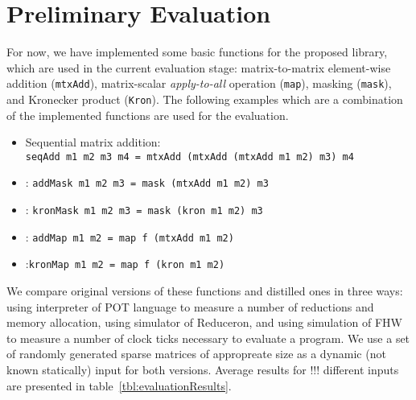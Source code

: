 \section{Preliminary Evaluation}

For now, we have implemented some basic functions for the proposed library, which are used in the current evaluation stage: matrix-to-matrix element-wise addition (\verb|mtxAdd|),
matrix-scalar \emph{apply-to-all} operation (\verb|map|),
masking (\verb|mask|), and Kronecker product (\verb|Kron|).
The following examples which are a combination of the implemented functions are used for the evaluation.
\begin{itemize}
\item Sequential matrix addition:\\
  \verb|seqAdd m1 m2 m3 m4 = mtxAdd (mtxAdd (mtxAdd m1 m2) m3) m4|
\item {}: \verb|addMask m1 m2 m3 = mask (mtxAdd m1 m2) m3|
\item {}: \verb|kronMask m1 m2 m3 = mask (kron m1 m2) m3 |  
\item {}: \verb|addMap m1 m2 = map f (mtxAdd m1 m2)|  
\item {}:\verb|kronMap m1 m2 = map f (kron m1 m2)|  
\end{itemize}
We compare original versions of these functions and distilled ones in three ways: using interpreter of POT language to measure a number of reductions and memory allocation, using simulator of Reduceron, and using simulation of FHW to measure a number of clock ticks necessary to evaluate a program.
We use a set of randomly generated sparse matrices of appropreate size as a dynamic (not known statically) input for both versions.
Average results for !!! different inputs are presented in table~\ref{tbl:evaluationResults}. 

